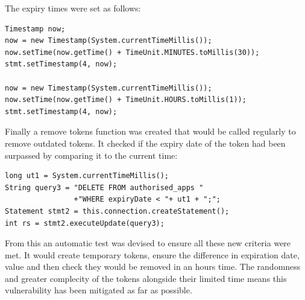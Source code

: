 The expiry times were set as follows:
\begin{verbatim}
Timestamp now;
now = new Timestamp(System.currentTimeMillis());
now.setTime(now.getTime() + TimeUnit.MINUTES.toMillis(30));
stmt.setTimestamp(4, now);

now = new Timestamp(System.currentTimeMillis());
now.setTime(now.getTime() + TimeUnit.HOURS.toMillis(1));
stmt.setTimestamp(4, now);
\end{verbatim}
Finally a remove tokens function was created that would be called regularly to remove outdated tokens. It checked if the expiry date of the token had been surpassed by comparing
it to the current time:
\begin{verbatim}
long ut1 = System.currentTimeMillis();
String query3 = "DELETE FROM authorised_apps "
                +"WHERE expiryDate < "+ ut1 + ";";
Statement stmt2 = this.connection.createStatement();
int rs = stmt2.executeUpdate(query3);
\end{verbatim}
From this an automatic test was devised to ensure all these new criteria were met. It would create temporary tokens, ensure the difference in expiration date, value and then check
they would be removed in an hours time. The randomness and greater complecity of the tokens alongside their limited time means this vulnerability has been mitigated as far as 
possible.

